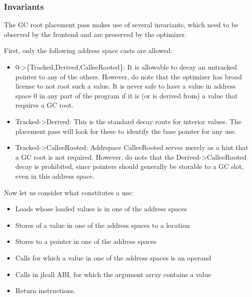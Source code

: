 \hypertarget{10709955215160021117}{}


\subsubsection{Invariants}



The GC root placement pass makes use of several invariants, which need to be observed by the frontend and are preserved by the optimizer.



First, only the following address space casts are allowed:



\begin{itemize}
\item 0->\{Tracked,Derived,CalleeRooted\}: It is allowable to decay an untracked pointer to any of the others. However, do note that the optimizer has broad license to not root such a value. It is never safe to have a value in address space 0 in any part of the program if it is (or is derived from) a value that requires a GC root.


\item Tracked->Derived: This is the standard decay route for interior values. The placement pass will look for these to identify the base pointer for any use.


\item Tracked->CalleeRooted: Addrspace CalleeRooted serves merely as a hint that a GC root is not required. However, do note that the Derived->CalleeRooted decay is prohibited, since pointers should generally be storable to a GC slot, even in this address space.

\end{itemize}


Now let us consider what constitutes a use:



\begin{itemize}
\item Loads whose loaded values is in one of the address spaces


\item Stores of a value in one of the address spaces to a location


\item Stores to a pointer in one of the address spaces


\item Calls for which a value in one of the address spaces is an operand


\item Calls in jlcall ABI, for which the argument array contains a value


\item Return instructions.

\end{itemize}


